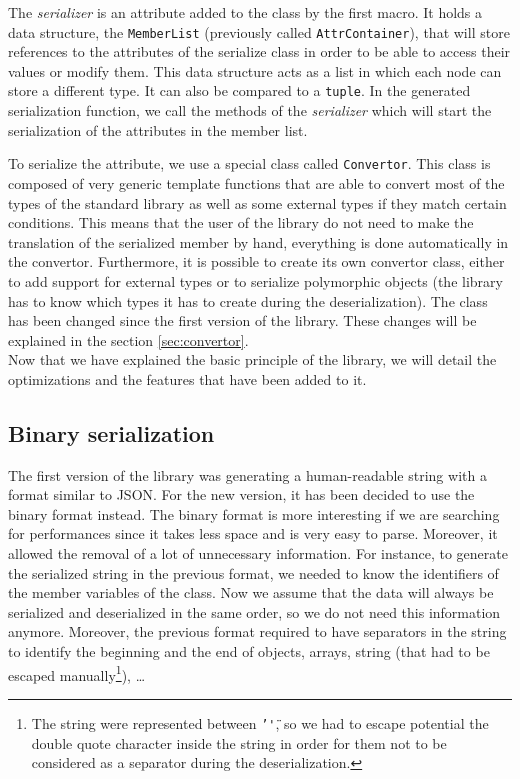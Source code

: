 The \textit{serializer} is an attribute added to the class by the first macro.
It holds a data structure, the \texttt{MemberList} (previously called
\texttt{AttrContainer}), that will store references to the attributes of the
serialize class in order to be able to access their values or modify them. This
data structure acts as a list in which each node can store a different type. It
can also be compared to a \texttt{tuple}. In the generated serialization
function, we call the methods of the \textit{serializer} which will start the
serialization of the attributes in the member list.

To serialize the attribute, we use a special class called \texttt{Convertor}.
This class is composed of very generic template functions that are able to
convert most of the types of the standard library as well as some external types
if they match certain conditions. This means that the user of the library do not
need to make the translation of the serialized member by hand, everything is
done automatically in the convertor. Furthermore, it is possible to create its
own convertor class, either to add support for external types or to serialize
polymorphic objects (the library has to know which types it has to create during
the deserialization). The class has been changed since the first version of the
library. These changes will be explained in the section \ref{sec:convertor}.\\

Now that we have explained the basic principle of the library, we will detail
the optimizations and the features that have been added to it.

\subsection{Binary serialization}

The first version of the library was generating a human-readable string with a
format similar to JSON. For the new version, it has been decided to use the
binary format instead. The binary format is more interesting if we are searching
for performances since it takes less space and is very easy to parse. Moreover,
it allowed the removal of a lot of unnecessary information. For instance, to
generate the serialized string in the previous format, we needed to know the
identifiers of the member variables of the class. Now we assume that the data
will always be serialized and deserialized in the same order, so we do not need
this information anymore. Moreover, the previous format required to have
separators in the string to identify the beginning and the end of objects,
arrays, string (that had to be escaped manually\footnote{The string were
represented between \texttt{'\"'}, so we had to escape potential the double quote
character inside the string in order for them not to be considered as a
separator during the deserialization.}), \dots

